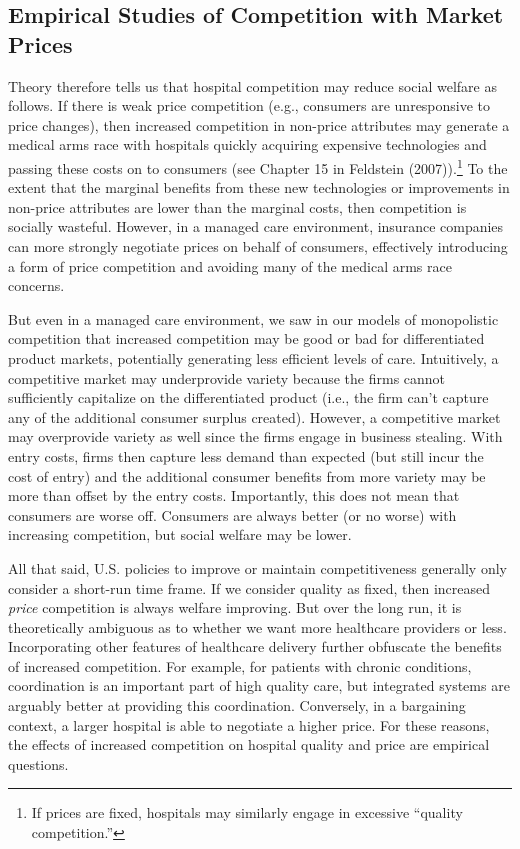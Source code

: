\documentclass[
  letterpaper,
  DIV=11,
  numbers=noendperiod]{scrreport}
\theoremstyle{definition}
\theoremstyle{remark}
\begin{document}
\hypertarget{empirical-studies-of-competition-with-market-prices}{%
\subsection{Empirical Studies of Competition with Market
Prices}\label{empirical-studies-of-competition-with-market-prices}}

Theory therefore tells us that hospital competition may reduce social
welfare as follows. If there is weak price competition (e.g., consumers
are unresponsive to price changes), then increased competition in
non-price attributes may generate a medical arms race with hospitals
quickly acquiring expensive technologies and passing these costs on to
consumers (see Chapter 15 in Feldstein (2007)).\footnote{If prices are
  fixed, hospitals may similarly engage in excessive ``quality
  competition.''} To the extent that the marginal benefits from these
new technologies or improvements in non-price attributes are lower than
the marginal costs, then competition is socially wasteful. However, in a
managed care environment, insurance companies can more strongly
negotiate prices on behalf of consumers, effectively introducing a form
of price competition and avoiding many of the medical arms race
concerns.

But even in a managed care environment, we saw in our models of
monopolistic competition that increased competition may be good or bad
for differentiated product markets, potentially generating less
efficient levels of care. Intuitively, a competitive market may
underprovide variety because the firms cannot sufficiently capitalize on
the differentiated product (i.e., the firm can't capture any of the
additional consumer surplus created). However, a competitive market may
overprovide variety as well since the firms engage in business stealing.
With entry costs, firms then capture less demand than expected (but
still incur the cost of entry) and the additional consumer benefits from
more variety may be more than offset by the entry costs. Importantly,
this does not mean that consumers are worse off. Consumers are always
better (or no worse) with increasing competition, but social welfare may
be lower.

All that said, U.S. policies to improve or maintain competitiveness
generally only consider a short-run time frame. If we consider quality
as fixed, then increased \textit{price} competition is always welfare
improving. But over the long run, it is theoretically ambiguous as to
whether we want more healthcare providers or less. Incorporating other
features of healthcare delivery further obfuscate the benefits of
increased competition. For example, for patients with chronic
conditions, coordination is an important part of high quality care, but
integrated systems are arguably better at providing this coordination.
Conversely, in a bargaining context, a larger hospital is able to
negotiate a higher price. For these reasons, the effects of increased
competition on hospital quality and price are empirical questions.
\end{document}
